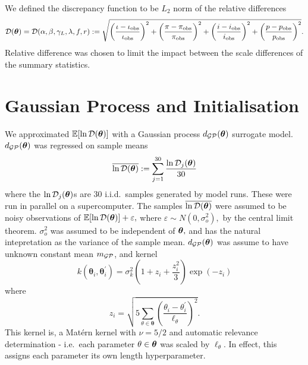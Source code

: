 We defined the discrepancy function to be $L_2$ norm of the relative
differences
$$
    \mathcal{D}(\bm{\theta}) = \mathcal{D}(\alpha, \beta, \gamma_L, \lambda, f, r)
    := \sqrt{
        \left(\frac{\iota - \iota_\text{obs}}{\iota_\text{obs}}\right)^2
        + \left(\frac{\pi - \pi_\text{obs}}{\pi_\text{obs}}\right)^2
        + \left(\frac{i - i_\text{obs}}{i_\text{obs}}\right)^2
        + \left(\frac{p - p_\text{obs}}{p_\text{obs}}\right)^2
    }.
$$
Relative difference was chosen to limit the impact between the scale
differences of the summary statistics.

\section{Gaussian Process and Initialisation}

We approximated $\operatorname{\mathbb{E}}[\ln\mathcal{D}(\bm{\theta})]$ with
a Gaussian process $d_{\mathcal{GP}}(\bm{\theta})$ surrogate model.
$d_{\mathcal{GP}}(\bm{\theta})$ was regressed on sample means
$$
    \overline{\ln\mathcal{D}(\bm{\theta})} := \sum_{j = 1}^{30} \frac{\ln\mathcal{D}_j(\bm{\theta})}{30}
$$
where the $\ln\mathcal{D}_j(\bm{\theta})$s are 30 i.i.d.\ samples generated by model runs.
These were run in parallel on a supercomputer.
The samples
$\overline{\ln\mathcal{D}(\bm{\theta})}$ were assumed to be noisy observations of
$\operatorname{\mathbb{E}}[\ln\mathcal{D}(\bm{\theta})] + \varepsilon,$ where
$\varepsilon \sim N(0, \sigma_o^2),$ by the central limit theorem.
$\sigma_o^2$ was assumed to be independent of $\bm{\theta},$ and has the natural
intepretation as the variance of the sample mean.
$d_{\mathcal{GP}}(\bm{\theta})$ was assume to have unknown constant mean $m_{\mathcal{GP}}$, and kernel
$$
    k(\bm{\theta}_i, \bm{\theta}_i^\prime)
    = \sigma_k^2 (1 + z_i + \frac{z_i^2}{3})\exp(-z_i)
$$
where
$$
    z_i = \sqrt{
        5 \sum_{\theta\in \bm{\theta}}\left(
        \frac{\theta_i - \theta_i^\prime}{\ell_\theta}
        \right)^2
    }.
$$
This kernel is, a Mat\'ern kernel with $\nu = 5/2$ and automatic
relevance determination - i.e.\ each parameter $\theta\in\bm{\theta}$ was
scaled by $\ell_\theta.$ In effect, this assigns each parameter its own
length hyperparameter.

